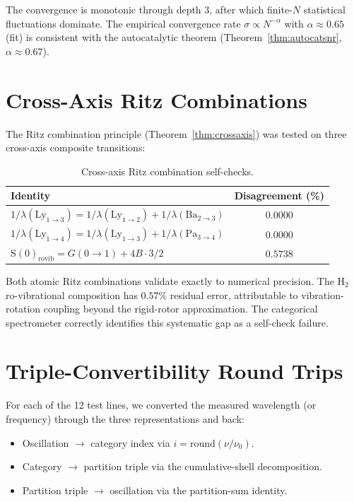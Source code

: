 \documentclass[twocolumn,11pt,a4paper]{article}
\theoremstyle{thmstyle}
\theoremstyle{axiomstyle}
\theoremstyle{definition}
\theoremstyle{remark}
\begin{document}
The convergence is monotonic through depth 3, after which finite-$N$ statistical fluctuations dominate. The empirical convergence rate $\sigma\propto N^{-\alpha}$ with $\alpha\approx 0.65$ (fit) is consistent with the autocatalytic theorem (Theorem~\ref{thm:autocatsnr}, $\alpha\approx 0.67$).

\section{Cross-Axis Ritz Combinations}
\label{sec:ritz_results}

The Ritz combination principle (Theorem~\ref{thm:crossaxis}) was tested on three cross-axis composite transitions:

\begin{table}[H]
\centering
\caption{Cross-axis Ritz combination self-checks.}
\label{tab:ritz}
\begin{tabular}{lc}
\toprule
Identity & Disagreement (\%)\\
\midrule
$1/\lambda(\mathrm{Ly}_{1\to 3})=1/\lambda(\mathrm{Ly}_{1\to 2})+1/\lambda(\mathrm{Ba}_{2\to 3})$ & $0.0000$\\
$1/\lambda(\mathrm{Ly}_{1\to 4})=1/\lambda(\mathrm{Ly}_{1\to 3})+1/\lambda(\mathrm{Pa}_{3\to 4})$ & $0.0000$\\
$\mathrm{S}(0)_{\mathrm{rovib}}=G(0\to 1)+4B\cdot 3/2$ & $0.5738$\\
\bottomrule
\end{tabular}
\end{table}

Both atomic Ritz combinations validate exactly to numerical precision. The H$_{2}$ ro-vibrational composition has $0.57\%$ residual error, attributable to vibration-rotation coupling beyond the rigid-rotor approximation. The categorical spectrometer correctly identifies this systematic gap as a self-check failure.

\section{Triple-Convertibility Round Trips}
\label{sec:triple_results}

For each of the 12 test lines, we converted the measured wavelength (or frequency) through the three representations and back:
\begin{itemize}[nosep]
\item Oscillation $\to$ category index via $i=\mathrm{round}(\nu/\nu_{0})$.
\item Category $\to$ partition triple via the cumulative-shell decomposition.
\item Partition triple $\to$ oscillation via the partition-sum identity.
\end{itemize}
\end{document}
